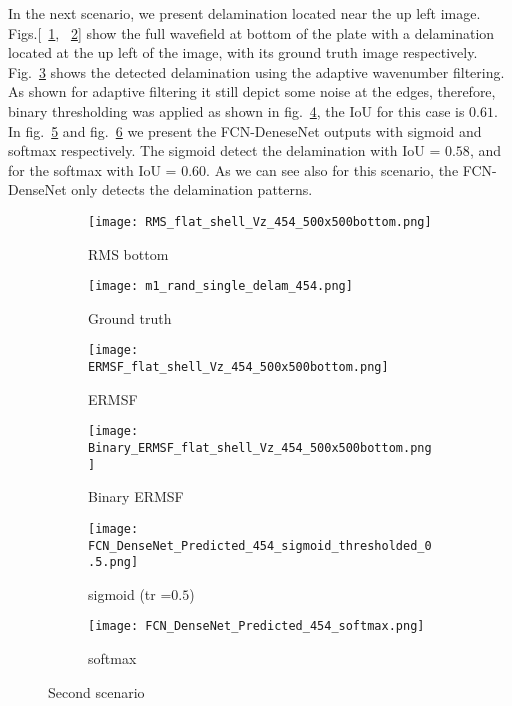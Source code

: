 	In the next scenario, we present delamination located near the up left image.
	Figs.[~\ref{fig:dispersion30deg_direct}, ~\ref{fig:m1_rand_single_delam_454}] show the full wavefield at bottom of the plate with a delamination located at the up left of the image, with its ground truth image respectively.
	Fig.~\ref{fig:ERMSF_flat_shell_Vz_454} shows the detected delamination using the adaptive wavenumber filtering.
	As shown for adaptive filtering it still depict some noise at the edges, therefore, binary thresholding was applied as shown in fig.~\ref{fig:Binary_ERMSF}, the IoU for this case is \(0.61\).
	In fig.~\ref{fig:predict_454_sigmoid_tr_0.5} and fig.~\ref{fig:predict_454_softmax} we present the FCN-DeneseNet outputs with sigmoid and softmax respectively.
	The sigmoid detect the delamination with IoU = \(0.58\), and for the softmax with IoU = \(0.60\).
	As we can see also for this scenario, the FCN-DenseNet only detects the delamination patterns.
	\begin{figure} [!h]
		\centering
		\begin{subfigure}[b]{0.47\textwidth}
			\centering
			\texttt{[image: RMS\_flat\_shell\_Vz\_454\_500x500bottom.png]}
			\caption{RMS bottom}
			\label{fig:dispersion30deg_direct}
		\end{subfigure}
		\hfill
		\begin{subfigure}[b]{0.47\textwidth}
			\centering
			\texttt{[image: m1\_rand\_single\_delam\_454.png]}
			\caption{Ground truth}
			\label{fig:m1_rand_single_delam_454}
		\end{subfigure}
		\hfill
		\begin{subfigure}[b]{0.47\textwidth}
			\centering
			\texttt{[image: ERMSF\_flat\_shell\_Vz\_454\_500x500bottom.png]}
			\caption{ERMSF}
			\label{fig:ERMSF_flat_shell_Vz_454}
		\end{subfigure}
		\hfill
		\begin{subfigure}[b]{0.47\textwidth}
			\centering
			\texttt{[image: Binary\_ERMSF\_flat\_shell\_Vz\_454\_500x500bottom.png]}
			\caption{Binary ERMSF}
			\label{fig:Binary_ERMSF}
		\end{subfigure}
		\hfill
		\begin{subfigure}[b]{0.47\textwidth}
			\centering
			\texttt{[image: FCN\_DenseNet\_Predicted\_454\_sigmoid\_thresholded\_0.5.png]}
			\caption{sigmoid (tr =\(0.5\))}
			\label{fig:predict_454_sigmoid_tr_0.5}
		\end{subfigure}
		\hfill	
		\begin{subfigure}[b]{0.47\textwidth}
			\centering
			\texttt{[image: FCN\_DenseNet\_Predicted\_454\_softmax.png]}
			\caption{softmax}
			\label{fig:predict_454_softmax}
		\end{subfigure}
		\caption{Second scenario}
		\label{fig:RMS454}
	\end{figure} 
